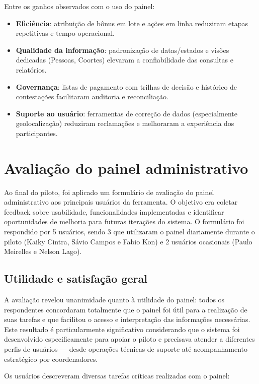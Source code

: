 Entre os ganhos observados com o uso do painel:
\begin{itemize}
  \item \textbf{Eficiência}: atribuição de bônus em lote e ações em linha
        reduziram etapas repetitivas e tempo operacional.
  \item \textbf{Qualidade da informação}: padronização de datas/estados e
        visões dedicadas (Pessoas, Coortes) elevaram a confiabilidade das
        consultas e relatórios.
  \item \textbf{Governança}: listas de pagamento com trilhas de decisão e
        histórico de contestações facilitaram auditoria e reconciliação.
  \item \textbf{Suporte ao usuário}: ferramentas de correção de dados
        (especialmente geolocalização) reduziram reclamações e melhoraram a
        experiência dos participantes.
\end{itemize}


\section{Avaliação do painel administrativo}
\label{sec:avaliacao-painel}

Ao final do piloto, foi aplicado um formulário de avaliação do painel administrativo aos principais usuários da ferramenta. O objetivo era coletar feedback sobre usabilidade, funcionalidades implementadas e identificar oportunidades de melhoria para futuras iterações do sistema. O formulário foi respondido por 5 usuários, sendo 3 que utilizaram o painel diariamente durante o piloto (Kaiky Cintra, Sávio Campos e Fabio Kon) e 2 usuários ocasionais (Paulo Meirelles e Nelson Lago).

\subsection{Utilidade e satisfação geral}

A avaliação revelou unanimidade quanto à utilidade do painel: todos os respondentes concordaram totalmente que o painel foi útil para a realização de suas tarefas e que facilitou o acesso e interpretação das informações necessárias. Este resultado é particularmente significativo considerando que o sistema foi desenvolvido especificamente para apoiar o piloto e precisava atender a diferentes perfis de usuários --- desde operações técnicas de suporte até acompanhamento estratégico por coordenadores.

Os usuários descreveram diversas tarefas críticas realizadas com o painel:

